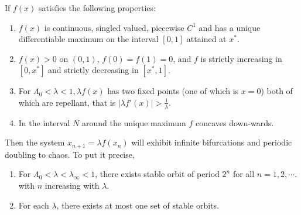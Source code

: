 \begin{thm}\label{th:criteria_for_infinite_bifurcations}
	If $f(x)$ satisfies the following properties:
	\begin{enumerate}
		\item $f(x)$ is continuous, singled valued, piecewise $C^1$ and has a unique differentiable maximum on the interval $[0,1]$ attained at $x^*$.
		\item $f(x) > 0$ on $(0,1)$, $f(0) = f(1) = 0$, and $f$ is strictly increasing in $[0, x^*]$ and strictly decreasing in $[x^*, 1]$.
		\item For $\Lambda_0 < \lambda < 1, \lambda f(x)$ has two fixed points (one of which is $x = 0$) both of which are repellant, that is $|\lambda f'(x)| > \frac{1}{\lambda}$.
		\item In the interval $N$ around the unique maximum $f$ concaves down-wards.
	\end{enumerate}
	Then the system $x_{n+1} = \lambda f(x_n)$ will exhibit infinite bifurcations and periodic doubling to chaos.
	To put it precise, 
	\begin{enumerate}
		\item For $\Lambda_0 < \lambda < \lambda_{\infty} < 1$, there exists stable orbit of period $2^n$ for all $n = 1, 2, \cdots$. with $n$ increasing with $\lambda$.
		\item For each $\lambda$, there exists at most one set of stable orbits.
	\end{enumerate}
\end{thm}

